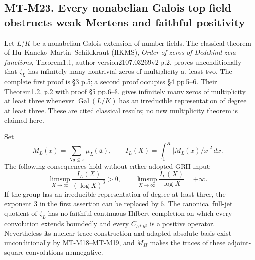 \subsection*{MT-M23. Every nonabelian Galois top field obstructs weak Mertens and faithful positivity}

Let $L/K$ be a nonabelian Galois extension of number fields. The
classical theorem of Hu--Kaneko--Martin--Schildkraut (HKMS),
\emph{Order of zeros of Dedekind zeta functions}, Theorem1.1,
author version2107.03269v2 p.2, proves unconditionally that
$\zeta_L$ has infinitely many nontrivial zeros of multiplicity
at least two. The complete first proof is \S3 p.5; a second
proof occupies \S4 pp.5--6. Their Theorem1.2, p.2 with proof
\S5 pp.6--8, gives infinitely many zeros of multiplicity at
least three whenever $\operatorname{Gal}(L/K)$ has an irreducible
representation of degree at least three. These are cited classical
results; no new multiplicity theorem is claimed here.

Set
\[
 M_L(x)=\sum_{N\mathfrak a\le x}\mu_L(\mathfrak a),\qquad
 I_L(X)=\int_1^X|M_L(x)/x|^2\,dx.
\]
The following consequences hold without either adopted GRH input:
\[
 \limsup_{X\to\infty}\frac{I_L(X)}{(\log X)^3}>0,
 \qquad
 \limsup_{X\to\infty}\frac{I_L(X)}{\log X}=+\infty.
 \tag{MT-M23a}
\]
If the group has an irreducible representation of degree at least
three, the exponent $3$ in the first assertion can be replaced by
$5$. The canonical full-jet quotient of $\zeta_L$ has no faithful
continuous Hilbert completion on which every convolution extends
boundedly and every $C_{h*h^\sharp}$ is a positive operator.
Nevertheless its nuclear trace construction and adapted absolute
basis exist unconditionally by MT-M18--MT-M19, and $M_H$ makes
the traces of these adjoint-square convolutions nonnegative.

